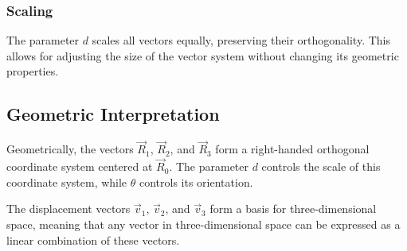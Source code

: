 \subsubsection{Scaling}

The parameter $d$ scales all vectors equally, preserving their orthogonality. This allows for adjusting the size of the vector system without changing its geometric properties.

\subsection{Geometric Interpretation}

Geometrically, the vectors $\vec{R}_1$, $\vec{R}_2$, and $\vec{R}_3$ form a right-handed orthogonal coordinate system centered at $\vec{R}_0$. The parameter $d$ controls the scale of this coordinate system, while $\theta$ controls its orientation.

The displacement vectors $\vec{v}_1$, $\vec{v}_2$, and $\vec{v}_3$ form a basis for three-dimensional space, meaning that any vector in three-dimensional space can be expressed as a linear combination of these vectors.
